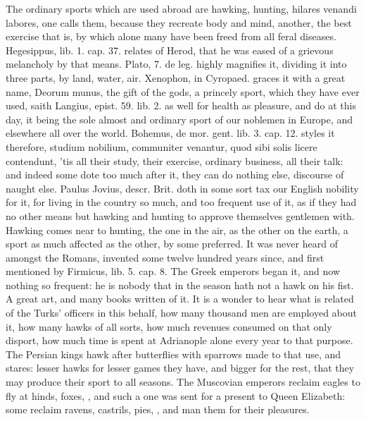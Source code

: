 {The ordinary sports which are used abroad are hawking, hunting, hilares
venandi labores, one calls them, because they recreate body and
mind, another, the best exercise that is, by which alone
many have been freed from all feral diseases. Hegesippus, lib. 1.
cap. 37. relates of Herod, that he was eased of a grievous melancholy
by that means. Plato, 7. de leg. highly magnifies it, dividing it into
three parts, by land, water, air. Xenophon, in Cyropaed. graces it with
a great name, Deorum munus, the gift of the gods, a princely sport,
which they have ever used, saith Langius, epist. 59. lib. 2. as well
for health as pleasure, and do at this day, it being the sole almost
and ordinary sport of our noblemen in Europe, and elsewhere all over
the world. Bohemus, de mor. gent. lib. 3. cap. 12. styles it therefore,
studium nobilium, communiter venantur, quod sibi solis licere
contendunt, 'tis all their study, their exercise, ordinary business,
all their talk: and indeed some dote too much after it, they can do
nothing else, discourse of naught else. Paulus Jovius, descr. Brit.
doth in some sort tax our  English nobility for it, for living in
the country so much, and too frequent use of it, as if they had no
other means but hawking and hunting to approve themselves gentlemen
with.
Hawking comes near to hunting, the one in the air, as the other on the
earth, a sport as much affected as the other, by some preferred.
It was never heard of amongst the Romans, invented some twelve
hundred years since, and first mentioned by Firmicus, lib. 5. cap. 8.
The Greek emperors began it, and now nothing so frequent: he is nobody
that in the season hath not a hawk on his fist. A great art, and many
books written of it. It is a wonder to hear what is related
of the Turks' officers in this behalf, how many thousand men are
employed about it, how many hawks of all sorts, how much revenues
consumed on that only disport, how much time is spent at Adrianople
alone every year to that purpose. The Persian kings hawk after
butterflies with sparrows made to that use, and stares: lesser hawks
for lesser games they have, and bigger for the rest, that they may
produce their sport to all seasons. The Muscovian emperors reclaim
eagles to fly at hinds, foxes, \etc{}, and such a one was sent for a
present to Queen Elizabeth: some reclaim ravens, castrils, pies,
\etc{}, and man them for their pleasures.
}
